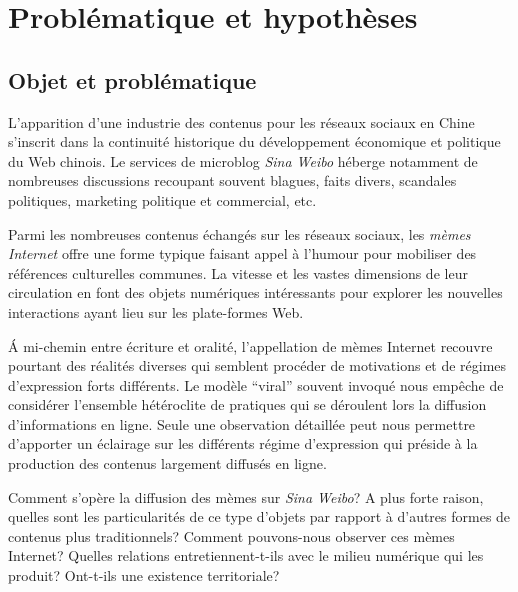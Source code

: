 \chapter*{Problématique et hypothèses}




\section*{Objet et problématique} 

L'apparition d'une industrie des contenus pour les réseaux sociaux en Chine s'inscrit dans la continuité historique du développement économique et politique du Web chinois. Le services de microblog \textit{Sina Weibo} héberge notamment de nombreuses discussions recoupant souvent blagues, faits divers, scandales politiques, marketing politique et commercial, etc.

Parmi les nombreuses contenus échangés sur les réseaux sociaux, les \textit{mèmes Internet} offre une forme typique faisant appel à l'humour pour mobiliser des références culturelles communes. La vitesse et les vastes dimensions de leur circulation en font des objets numériques intéressants pour explorer les nouvelles interactions ayant lieu sur les plate-formes Web. 

\'A mi-chemin entre écriture et oralité, l’appellation de mèmes Internet recouvre pourtant des réalités diverses qui semblent procéder de motivations et de régimes d'expression forts différents. Le modèle ``viral'' souvent invoqué nous empêche de considérer l'ensemble hétéroclite de pratiques qui se déroulent lors la diffusion d'informations en ligne. Seule une observation détaillée peut nous permettre d'apporter un éclairage sur les différents régime d'expression qui préside à la production des contenus largement diffusés en ligne.

Comment s'opère la diffusion des mèmes sur \textit{Sina Weibo}? A plus forte raison, quelles sont les particularités de ce type d'objets par rapport à d'autres formes de contenus plus traditionnels? Comment pouvons-nous observer ces mèmes Internet? Quelles relations entretiennent-t-ils avec le milieu numérique qui les produit? Ont-t-ils une existence territoriale?

